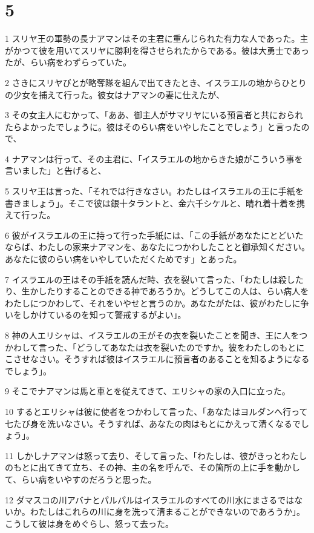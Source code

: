 \chapter{5}

\par 1 スリヤ王の軍勢の長ナアマンはその主君に重んじられた有力な人であった。主がかつて彼を用いてスリヤに勝利を得させられたからである。彼は大勇士であったが、らい病をわずらっていた。
\par 2 さきにスリヤびとが略奪隊を組んで出てきたとき、イスラエルの地からひとりの少女を捕えて行った。彼女はナアマンの妻に仕えたが、
\par 3 その女主人にむかって、「ああ、御主人がサマリヤにいる預言者と共におられたらよかったでしょうに。彼はそのらい病をいやしたことでしょう」と言ったので、
\par 4 ナアマンは行って、その主君に、「イスラエルの地からきた娘がこういう事を言いました」と告げると、
\par 5 スリヤ王は言った、「それでは行きなさい。わたしはイスラエルの王に手紙を書きましょう」。そこで彼は銀十タラントと、金六千シケルと、晴れ着十着を携えて行った。
\par 6 彼がイスラエルの王に持って行った手紙には、「この手紙があなたにとどいたならば、わたしの家来ナアマンを、あなたにつかわしたことと御承知ください。あなたに彼のらい病をいやしていただくためです」とあった。
\par 7 イスラエルの王はその手紙を読んだ時、衣を裂いて言った、「わたしは殺したり、生かしたりすることのできる神であろうか。どうしてこの人は、らい病人をわたしにつかわして、それをいやせと言うのか。あなたがたは、彼がわたしに争いをしかけているのを知って警戒するがよい」。
\par 8 神の人エリシャは、イスラエルの王がその衣を裂いたことを聞き、王に人をつかわして言った、「どうしてあなたは衣を裂いたのですか。彼をわたしのもとにこさせなさい。そうすれば彼はイスラエルに預言者のあることを知るようになるでしょう」。
\par 9 そこでナアマンは馬と車とを従えてきて、エリシャの家の入口に立った。
\par 10 するとエリシャは彼に使者をつかわして言った、「あなたはヨルダンへ行って七たび身を洗いなさい。そうすれば、あなたの肉はもとにかえって清くなるでしょう」。
\par 11 しかしナアマンは怒って去り、そして言った、「わたしは、彼がきっとわたしのもとに出てきて立ち、その神、主の名を呼んで、その箇所の上に手を動かして、らい病をいやすのだろうと思った。
\par 12 ダマスコの川アバナとパルパルはイスラエルのすべての川水にまさるではないか。わたしはこれらの川に身を洗って清まることができないのであろうか」。こうして彼は身をめぐらし、怒って去った。
